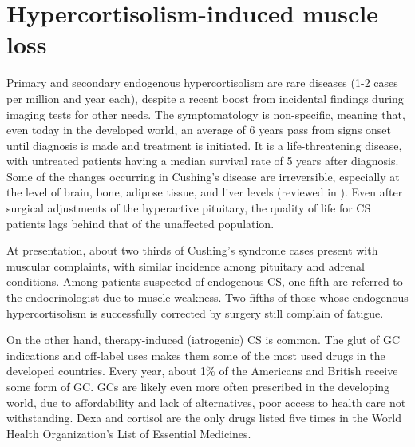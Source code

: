 \documentclass[12pt,english]{report}\usepackage[]{graphicx}\usepackage[]{color}
\begin{document}
\section{Hypercortisolism-induced muscle loss}

Primary and secondary endogenous hypercortisolism are rare diseases
(1-2 cases per million and year each\citep{lindholm2001incidence}),
despite a recent boost from incidental findings during imaging tests
for other needs. The symptomatology is non-specific, meaning that,
even today in the developed world, an average of 6 years pass from
signs onset until diagnosis is made and treatment is initiated\citep{psaras2011demographic}.
It is a life-threatening disease, with untreated patients having a
median survival rate of 5 years after diagnosis\citep{plotz1952natural}.
Some of the changes occurring in Cushing's disease are irreversible,
especially at the level of brain, bone, adipose tissue, and liver
levels (reviewed in \citep{valassi2012clinical}). Even after surgical
adjustments of the hyperactive pituitary, the quality of life for
CS patients lags behind that of the unaffected population. 

At presentation, about two thirds of Cushing's syndrome cases present
with muscular complaints, with similar incidence among pituitary and
adrenal conditions\citep{valassi2011european}. Among patients suspected
of endogenous CS, one fifth are referred to the endocrinologist due
to muscle weakness\citep{muller2006diagnosis}. Two-fifths of those
whose endogenous hypercortisolism is successfully corrected by surgery
still complain of fatigue\citep{lindsay2006long-term}. 

On the other hand, therapy-induced (iatrogenic) CS is common. The
glut of GC indications and off-label uses makes them some of the most
used drugs in the developed countries. Every year, about 1\% of the
Americans and British receive some form of GC\citep{skversky2011association,vanstaa2000use}.
GCs are likely even more often prescribed in the developing world,
due to affordability and lack of alternatives, poor access to health
care not withstanding. Dexa and cortisol are the only drugs listed
five times in the World Health Organization's List of Essential Medicines\citep{worldhealthorganization2013who}.
\end{document}
